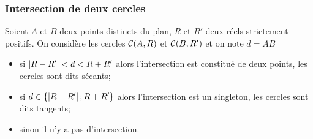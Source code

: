 \subsubsection{Intersection de deux cercles}
\begin{prop}
  Soient \(A\) et \(B\) deux points distincts du plan, \(R\) et \(R'\) deux réels strictement positifs. On considère les cercles \(\mathcal{C}(A,R)\) et \(\mathcal{C}(B,R')\) et on note \(d=AB\)
  \begin{itemize}
  \item si \(\left\lvert R-R'\right\rvert<d<R+R'\) alors l'intersection est constitué de deux points, les cercles sont dits sécants;
  \item si \(d \in \{\left\lvert R-R'\right\rvert;R+R'\}\) alors l'intersection est un singleton, les cercles sont dits tangents;
  \item sinon il n'y a pas d'intersection.
  \end{itemize}
\end{prop}
